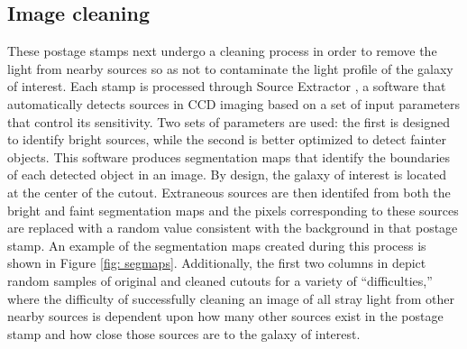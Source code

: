 \subsection{Image cleaning}
These postage stamps next undergo a cleaning process in order to remove the light from nearby sources so as not to contaminate the light profile of the galaxy of interest. Each stamp is processed through Source Extractor \citep[ver. 2.8.6;][]{sextractor}, a software that automatically detects sources in CCD imaging based on a set of input parameters that control its sensitivity. Two sets of parameters are used: the first is designed to identify bright sources, while the second is better optimized to detect fainter objects. This software produces segmentation maps that identify the boundaries of each detected object in an image. By design, the galaxy of interest is located at the center of the cutout. Extraneous sources are then identifed from both the bright and faint segmentation maps and the pixels corresponding to these sources are replaced with a random value consistent with the background in that postage stamp.  An example of the segmentation maps created during this process is shown in Figure \ref{fig: segmaps}. Additionally, the first two columns in  depict random samples of original and cleaned cutouts for a variety of ``difficulties,'' where the difficulty of successfully cleaning an image of all stray light from other nearby sources is dependent upon how many other sources exist in the postage stamp and how close those sources are to the galaxy of interest. 


